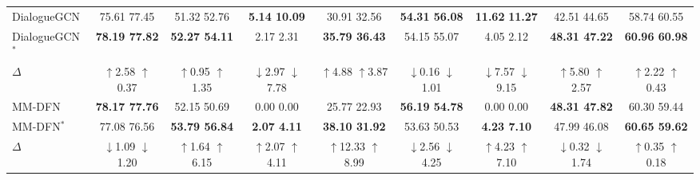 {{\begin{table*}[!t]
{\begin{tabular}{l|cccccccc}
			DialogueGCN    \cite{ghosal2019dialoguegcn}            & 75.61   77.45       & 51.32  52.76        & \textbf{5.14  10.09}     & 30.91  32.56       & {\textbf{54.31  56.08}}       & \textbf{11.62}  \textbf{11.27}     & 42.51  44.65       & 58.74 60.55 \\
			\rowcolor{gray!30}
			DialogueGCN$^\ast$ & \textbf{78.19 77.82} & \textbf{52.27 54.11}  & 2.17 2.31 & \textbf{35.79 36.43} & {54.15 55.07} & 4.05 {2.12} & \textbf{48.31 47.22} & \textbf{60.96 60.98}\\ 
			$\Delta$ & \textcolor[rgb]{0.0,0.6,0.0}{$\uparrow$2.58} \textcolor[rgb]{0.0,0.6,0.0}{$\uparrow$0.37} & \textcolor[rgb]{0.0,0.6,0.0}{$\uparrow$0.95} \textcolor[rgb]{0.0,0.6,0.0}{$\uparrow$1.35} & \textcolor[rgb]{0.2,0.2,0.2}{$\downarrow$2.97} \textcolor[rgb]{0.2,0.2,0.2}{$\downarrow$7.78} & \textcolor[rgb]{0.0,0.6,0.0}{$\uparrow$4.88} \textcolor[rgb]{0.0,0.6,0.0}{$\uparrow$3.87} & \textcolor[rgb]{0.2,0.2,0.2}{$\downarrow$0.16} \textcolor[rgb]{0.2,0.2,0.2}{$\downarrow$1.01} & \textcolor[rgb]{0.2,0.2,0.2}{$\downarrow$7.57} \textcolor[rgb]{0.2,0.2,0.2}{$\downarrow$9.15} & \textcolor[rgb]{0.0,0.6,0.0}{$\uparrow$5.80} \textcolor[rgb]{0.0,0.6,0.0}{$\uparrow$2.57} & \textcolor[rgb]{0.0,0.6,0.0}{$\uparrow$2.22} \textcolor[rgb]{0.0,0.6,0.0}{$\uparrow$0.43}  \\ \hline
			
			MM-DFN  \cite{hu2022mm}              & \textbf{78.17 77.76}       & 52.15 50.69        & {0.00  0.00}     & 25.77  22.93       & \textbf{56.19  54.78}       & 0.00 0.00     & \textbf{48.31  47.82  }     & 60.30  59.44 \\
			\rowcolor{gray!30}
			MM-DFN$^\ast$ & {77.08 76.56} & \textbf{53.79 56.84}  & \textbf{2.07 4.11} & \textbf{38.10 31.92} & {53.63 50.53} & \textbf{4.23 7.10} & {47.99 46.08} & \textbf{60.65 59.62}\\ 
			$\Delta$ & \textcolor[rgb]{0.2,0.2,0.2}{$\downarrow$1.09} \textcolor[rgb]{0.2,0.2,0.2}{$\downarrow$1.20} & \textcolor[rgb]{0.0,0.6,0.0}{$\uparrow$1.64} \textcolor[rgb]{0.0,0.6,0.0}{$\uparrow$6.15}  & \textcolor[rgb]{0.0,0.6,0.0}{$\uparrow$2.07} \textcolor[rgb]{0.0,0.6,0.0}{$\uparrow$4.11} & \textcolor[rgb]{0.0,0.6,0.0}{$\uparrow$12.33} \textcolor[rgb]{0.0,0.6,0.0}{$\uparrow$8.99} & \textcolor[rgb]{0.2,0.2,0.2}{$\downarrow$2.56} \textcolor[rgb]{0.2,0.2,0.2}{$\downarrow$4.25} & \textcolor[rgb]{0.0,0.6,0.0}{$\uparrow$4.23} \textcolor[rgb]{0.0,0.6,0.0}{$\uparrow$7.10} & \textcolor[rgb]{0.2,0.2,0.2}{$\downarrow$0.32} \textcolor[rgb]{0.2,0.2,0.2}{$\downarrow$1.74}  & \textcolor[rgb]{0.0,0.6,0.0}{$\uparrow$0.35} \textcolor[rgb]{0.0,0.6,0.0}{$\uparrow$0.18} \\ \hline
			

\end{tabular}}
\end{table*}}}
